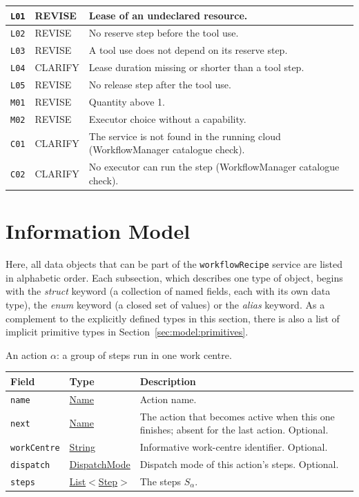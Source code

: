 \documentclass[a4paper]{arrowhead}
\newcommand{\mref}[1]{{\textcolor{ArrowheadPurple}{\hyperref[sec:model:#1]{#1}}}}
\newcommand{\pref}[1]{{\textcolor{ArrowheadGrey}{\hyperref[sec:model:primitives:#1]{#1}}}}
\begin{document}
{\begin{longtable}{|p{1.3cm}|p{1.9cm}|p{12.8cm}|}
\texttt{L01} & REVISE & Lease of an undeclared resource. \\ \hline
\texttt{L02} & REVISE & No reserve step before the tool use. \\ \hline
\texttt{L03} & REVISE & A tool use does not depend on its reserve step. \\ \hline
\texttt{L04} & CLARIFY & Lease duration missing or shorter than a tool step. \\ \hline
\texttt{L05} & REVISE & No release step after the tool use. \\ \hline
\texttt{M01} & REVISE & Quantity above 1. \\ \hline
\texttt{M02} & REVISE & Executor choice without a capability. \\ \hline
\texttt{C01} & CLARIFY & The service is not found in the running cloud (WorkflowManager catalogue check). \\ \hline
\texttt{C02} & CLARIFY & No executor can run the step (WorkflowManager catalogue check). \\ \hline
\end{longtable}
}


\newpage
\section{Information Model}
\label{sec:model}
Here, all data objects that can be part of the \texttt{workflow\allowbreak{}Recipe} service are listed in alphabetic order. Each
subsection, which describes one type of object, begins with the \textit{struct} keyword (a collection of named fields,
each with its own data type), the \textit{enum} keyword (a closed set of values) or the \textit{alias} keyword. As a
complement to the explicitly defined types in this section, there is also a list of implicit primitive types in
Section~\ref{sec:model:primitives}.

An action $\alpha$: a group of steps run in one work centre.

{\small
\begin{longtable}{|p{3.9cm}|p{4.4cm}|p{7.5cm}|}

\hline
\rowcolor{gray!33} Field & Type & Description \\ \hline
\endhead
\texttt{name} & \pref{Name} & Action name. \\ \hline
\texttt{next} & \pref{Name} & The action that becomes active when this one finishes; absent for the last action. Optional. \\ \hline
\texttt{workCentre} & \pref{String} & Informative work-centre identifier. Optional. \\ \hline
\texttt{dispatch} & \mref{DispatchMode} & Dispatch mode of this action's steps. Optional. \\ \hline
\texttt{steps} & \pref{List}$<$\mref{Step}$>$ & The steps $S_\alpha$. \\ \hline
\end{longtable}
}
\end{document}
